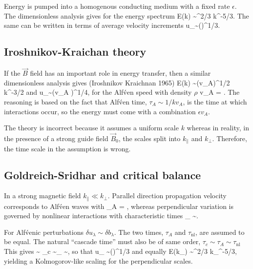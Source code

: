 \documentclass[usenatbib,twocolumn]{aastex63}
\begin{document}
Energy is pumped into a homogenous conducting medium with a fixed rate $\epsilon$.
The dimensionless analysis gives for the energy spectrum \citep{Kolmogorov_1941}
\be
E(k) \sim \epsilon^{2/3} k^{-5/3}.
\ee
The same can be written in terms of average velocity increments
\be
\delta u_\lambda \sim (\epsilon \lambda)^{1/3}.
\ee

\subsection{Iroshnikov-Kraichan theory}\label{sect:K65}

If the $\vec{B}$ field has an important role in energy transfer, then a similar dimensionless analysis gives (Iroshnikov Kraichnan 1965)
\be
E(k) \sim (\epsilon v_A)^{1/2} k^{-3/2}
\ee
and
\be
\delta u_\lambda \sim (\epsilon v_A \lambda)^{1/4},
\ee
for the Alf\'ven speed with density $\rho$
\be
v_A = .
\ee
The reasoning is based on the fact that Alf\'ven time, $\tau_A \sim 1/k v_A$, is the time at which interactions occur, so the energy must come with a combination $\epsilon v_A$.

The theory is incorrect because it assumes a uniform scale $k$ whereas in reality, in the presence of a strong guide field $\vec{B}_0$, the scales split into $k_{\parallel}$ and $k_{\perp}$.
Therefore, the time scale in the assumption is wrong.


\subsection{Goldreich-Sridhar and critical balance}\label{sect:GS95}

In a strong magnetic field $k_{\parallel} \ll k_{\perp}$.
Parallel direction propagation velocity corresponds to Alf\'ven waves with 
\be
\tau_A = ,
\ee
whereas perpendicular variation is governed by nonlinear interactions with characteristic times
\be
\tau_{} \sim {}.
\ee

For Alf\'venic perturbations $\delta u_{\lambda} \sim \delta b_{\lambda}$.
The two times, $\tau_A$ and $\tau_{\mathrm{nl}}$, are assumed to be equal.
The natural ``cascade time'' must also be of same order, $\tau_c \sim \tau_A \sim \tau_{\mathrm{nl}}$
This gives 
\be
{} \sim \epsilon \quad{}\quad
\tau_c \sim \tau_{} \sim {},
\ee
so that
\be
\delta u_{\lambda} \sim (\epsilon \lambda)^{1/3}
\ee
and equally \citep{Goldreich_1995, 1997}
\be
E(k_\perp) \sim \epsilon^{2/3} k_{\perp}^{-5/3},
\ee
yielding a Kolmogorov-like scaling for the perpendicular scales.
\end{document}
